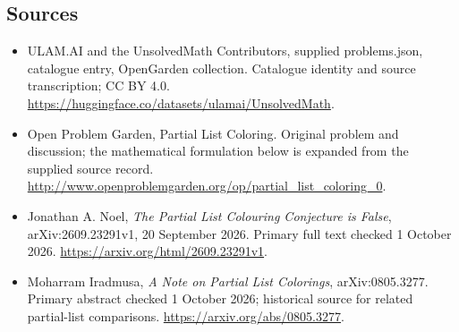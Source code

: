 \documentclass[11pt,a4paper]{article}
\begin{document}
\subsection{Sources}
\begin{itemize}
\item[S1] ULAM.AI and the UnsolvedMath Contributors, supplied problems.json, catalogue entry, OpenGarden collection. Catalogue identity and source transcription; CC BY 4.0.
\url{https://huggingface.co/datasets/ulamai/UnsolvedMath}.
\item[S2] Open Problem Garden, Partial List Coloring. Original problem and discussion; the mathematical formulation below is expanded from the supplied source record.
\url{http://www.openproblemgarden.org/op/partial_list_coloring_0}.
\item[R1] Jonathan A. Noel, \emph{The Partial List Colouring
Conjecture is False}, arXiv:2609.23291v1, 20 September 2026.
Primary full text checked 1 October 2026.
\url{https://arxiv.org/html/2609.23291v1}.
\item[R2] Moharram Iradmusa, \emph{A Note on Partial List Colorings},
arXiv:0805.3277. Primary abstract checked 1 October 2026; historical
source for related partial-list comparisons.
\url{https://arxiv.org/abs/0805.3277}.
\end{itemize}
\end{document}

